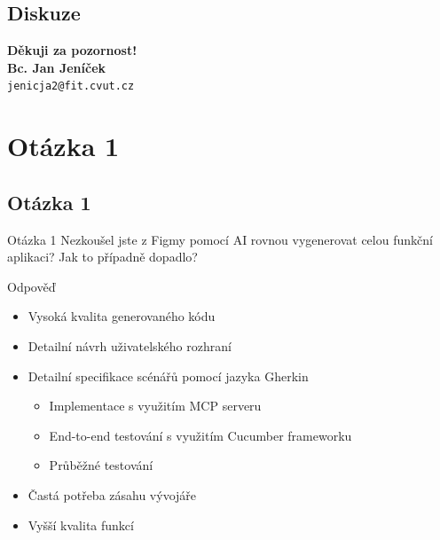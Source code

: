 \documentclass[a4paper]{beamer}
\makeatletter
\newcommand\PersonTitle{Bc.}
\newcommand\FirstName{Jan}
\newcommand\LastName{Jeníček}
\newcommand\Email{jenicja2@fit.cvut.cz}
\makeatother
\begin{document}
\subsection*{Diskuze}
\begin{frame}
\begin{center}
\vspace*{1cm}
{\bf Děkuji za pozornost!}\\
\vspace*{2cm}
{\bf\Large \PersonTitle{} \FirstName{} \LastName{}}\\
{\tt \Email}
\vspace*{1cm}
\end{center}
\vfill
\end{frame}
%
\appendix
\section{Otázka 1}
\subsection{Otázka 1}
\begin{frame}
\begin{block}{Otázka 1}
    Nezkoušel jste z Figmy pomocí AI rovnou vygenerovat celou funkční aplikaci? Jak to případně dopadlo?
\end{block}

\begin{exampleblock}{Odpověď}
    \begin{itemize}
        \item Vysoká kvalita generovaného kódu
        \item Detailní návrh uživatelského rozhraní
        \item Detailní specifikace scénářů pomocí jazyka Gherkin
        \begin{itemize}
            \item Implementace s využitím MCP serveru
            \item End-to-end testování s využitím Cucumber frameworku
            \item Průběžné testování
        \end{itemize}
        \item Častá potřeba zásahu vývojáře
        \item Vyšší kvalita funkcí
    \end{itemize}
\end{exampleblock}
\end{frame}
\end{document}

